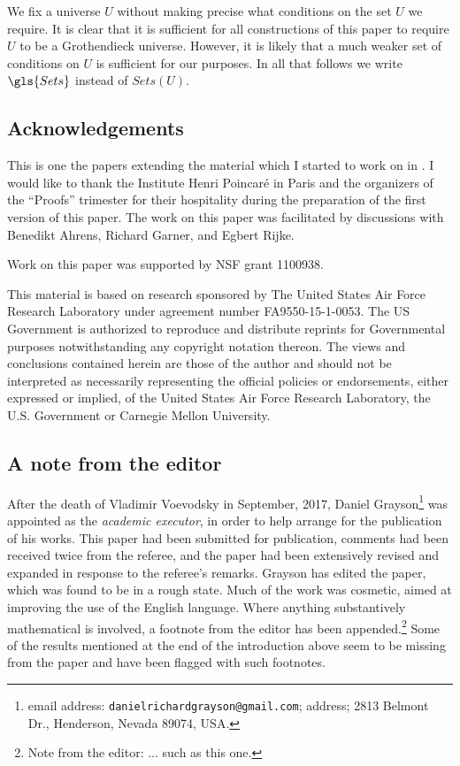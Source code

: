 \documentclass[onecolumn,12pt]{amsart}
\numberwithin{proposition}{subsection}
\newcommand{\editorfootnote}[1]{\footnote{Note from the editor: #1}}
\begin{document}
We fix a universe $U$ without making precise what conditions on the set $U$ we
require. It is clear that it is sufficient for all constructions of this paper
to require $U$ to be a Grothendieck universe. However, it is likely that a much
weaker set of conditions on $U$ is sufficient for our purposes. In all that
follows we write $\gls{Sets}$ instead of $Sets(U)$.

\subsection{Acknowledgements}

This is one the papers extending the material which I started to work on in
\cite{NTS}. I would like to thank the Institute Henri Poincar\'e in Paris and the
organizers of the ``Proofs'' trimester for their hospitality during the
preparation of the first version of this paper. The work on this paper was
facilitated by discussions with Benedikt Ahrens, Richard Garner, and Egbert
Rijke.

Work on this paper was supported by NSF grant 1100938.

This material is based on research sponsored by The United States Air
  Force Research Laboratory under agreement number FA9550-15-1-0053. The US
  Government is authorized to reproduce and distribute reprints for
  Governmental purposes notwithstanding any copyright notation thereon.
The views and conclusions contained herein are those of the author and should
not be interpreted as necessarily representing the official policies or
endorsements, either expressed or implied, of the United States Air Force
Research Laboratory, the U.S. Government or Carnegie Mellon University.

\subsection{A note from the editor}

After the death of Vladimir Voevodsky in
September, 2017, Daniel Grayson\footnote{email address: {\tt danielrichardgrayson@gmail.com}; address; 2813 Belmont Dr., Henderson, Nevada 89074, USA.} was appointed as the {\em academic executor},
in order to help arrange for the publication of his works.  This paper had been
submitted for publication, comments had been received twice from the referee,
and the paper had been extensively revised and expanded in response to the
referee's remarks.  Grayson has edited the paper, which was found
to be in a rough state.  Much of the work was cosmetic, aimed at improving the
use of the English language.  Where anything substantively mathematical is
involved, a footnote from the editor has been appended.\editorfootnote{... such
  as this one.}  Some of the results mentioned at the end of the introduction above
seem to be missing from the paper and have been flagged with such footnotes.
\end{document}

